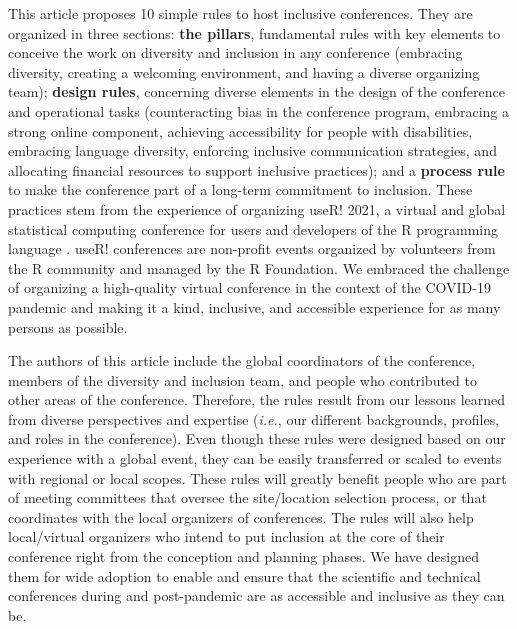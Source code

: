 \documentclass[10pt,letterpaper]{article}
\begin{document}
This article proposes 10 simple rules to host inclusive conferences.
They are organized in three sections: \textbf{the pillars}, fundamental rules with key elements to conceive the work on diversity and inclusion in any conference (embracing diversity, creating a welcoming environment, and having a diverse organizing team); \textbf{design rules}, concerning diverse elements in the design of the conference and operational tasks (counteracting bias in the conference program, embracing a strong online component, achieving accessibility for people with disabilities, embracing language diversity, enforcing inclusive communication strategies, and allocating financial resources to support inclusive practices); and a \textbf{process rule} to make the conference part of a long-term commitment to inclusion. 
These practices stem from the experience of organizing useR! 2021, a virtual and global statistical computing conference for users and developers of the R programming language \cite{r_core_team_2021}. useR! conferences are non-profit events organized by volunteers from the R community and managed by the R Foundation.
We embraced the challenge of organizing a high-quality virtual conference in the context of the COVID-19 pandemic and making it a kind, inclusive, and accessible experience for as many persons as possible.

The authors of this article include the global coordinators of the conference, members of the diversity and inclusion team, and people who contributed to other areas of the conference. 
Therefore, the rules result from our lessons learned from diverse perspectives and expertise (\textit{i.e.}, our different backgrounds, profiles, and roles in the conference). 
Even though these rules were designed based on our experience with a global event, they can be easily transferred or scaled to events with regional or local scopes.
These rules will greatly benefit people who are part of meeting committees that oversee the site/location selection process, or that coordinates with the local organizers of conferences.
The rules will also help local/virtual organizers who intend to put inclusion at the core of their conference right from the conception and planning phases. We have designed them for wide adoption to enable and ensure that the scientific and technical conferences during and post-pandemic are as accessible and inclusive as they can be. 
\end{document}
